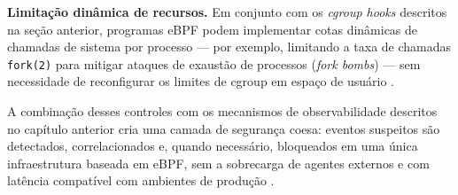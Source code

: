\textbf{Limitação dinâmica de recursos.}
Em conjunto com os \textit{cgroup hooks} descritos na seção anterior, programas
eBPF podem implementar cotas dinâmicas de chamadas de sistema por processo — por
exemplo, limitando a taxa de chamadas \texttt{fork(2)} para mitigar ataques de
exaustão de processos (\textit{fork bombs}) — sem necessidade de reconfigurar
os limites de cgroup em espaço de usuário \cite{linuxkernel2024}.

A combinação desses controles com os mecanismos de observabilidade descritos no
capítulo anterior cria uma camada de segurança coesa: eventos suspeitos são
detectados, correlacionados e, quando necessário, bloqueados em uma única
infraestrutura baseada em eBPF, sem a sobrecarga de agentes externos e com
latência compatível com ambientes de produção \cite{majors2022}.